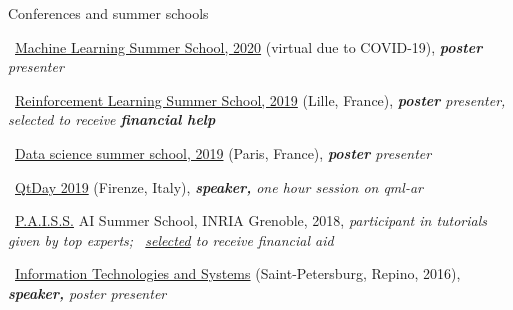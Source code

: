 \documentclass{resume} %
\newcommand*{\img}[1]{%
	\raisebox{-.02\baselineskip}{%
		\texttt{[image: \#1]}%
	}%
}
\newcommand*{\emoji}[1]{\img{./emoji/#1.png}}
\newcommand{\mylink}{{\color{gray}\faExternalLink}}
\begin{document}
\begin{rSection}{Conferences and summer schools}
\vspace{-1em}
\item \emoji{flag-de} \mylink~\href{http://mlss.tuebingen.mpg.de/2020/}{Machine Learning Summer School, 2020} (virtual due to COVID-19){, \em {\bf poster} presenter}
\item \emoji{flag-fr} \mylink~\href{https://rlss.inria.fr}{Reinforcement Learning Summer School, 2019} (Lille, France){, \em {\bf poster} presenter, selected to receive {\bf financial help}}
\item \emoji{flag-fr} \mylink~\href{https://ds3-datascience-polytechnique.fr}{Data science summer school, 2019} (Paris, France){, \em {\bf poster} presenter}
\item \emoji{flag-it} \mylink~\href{https://www.qtday.it/agenda/session/52811}{QtDay 2019} (Firenze, Italy){, \em {\bf speaker,} one hour session on qml-ar}
\item \emoji{flag-fr} \mylink~\href{https://project.inria.fr/paiss/}{P.A.I.S.S.} AI Summer School, INRIA Grenoble, 2018{, \em participant in tutorials given by top experts; \mylink~\href{http://www.europe.naverlabs.com/Blog/Students-at-PAISS}{selected} to receive financial aid }
\item \emoji{flag-ru} \mylink~\href{http://iitp.ru/en/conferences/itas}{Information Technologies and Systems} (Saint-Petersburg, Repino, 2016){, \em {\bf speaker,} poster presenter}
\end{rSection}

\end{document}
